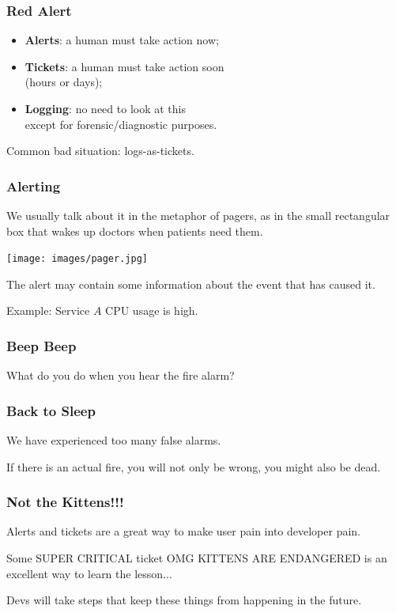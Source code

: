 \begin{frame}
\frametitle{Red Alert}


\begin{itemize}
\item {\bf Alerts}: a human must take action now;
\item {\bf Tickets}: a human must take action soon \\ \qquad (hours or days);
\item {\bf Logging}: no need to look at this \\ \qquad except for forensic/diagnostic purposes.
\end{itemize}


Common bad situation: logs-as-tickets.
\end{frame}



\begin{frame}
\frametitle{Alerting}

 We usually talk about it in the metaphor of pagers, as in the small rectangular box that wakes up doctors when patients need them.
 
 \begin{center}
	\texttt{[image: images/pager.jpg]}
\end{center}

The alert may contain some information about the event that has caused it.

Example: Service $A$ CPU usage is high.

\end{frame}


\begin{frame}
\frametitle{Beep Beep}

\large

What do you do when you hear the fire alarm?

\end{frame}


\begin{frame}
\frametitle{Back to Sleep}

We have experienced too many false alarms.


If there is an actual fire, you will not only be wrong, you might also be dead.
\end{frame}


\begin{frame}
\frametitle{Not the Kittens!!!}

Alerts and tickets are a great way to make user pain into developer pain.

Some SUPER CRITICAL ticket OMG KITTENS ARE ENDANGERED is an excellent way to learn the lesson... 

Devs will take steps that keep these things from happening in the future.
\end{frame}


